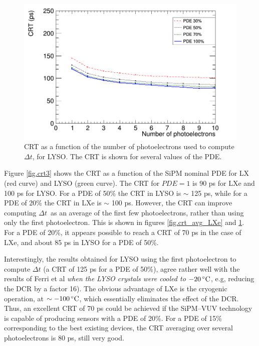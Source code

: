 \documentclass[11pt,a4paper]{article}
\begin{document}
 \begin{figure}[!bhtp]
	\centering
	\includegraphics[scale=0.40]{img/lyso_noCher_avg_npe_phys.png}
	\caption{\label{fig.crt_avg_LYSO} CRT as a function of the number of photoelectrons used to compute $\Delta t$, for LYSO. The CRT is shown for several values of the PDE.}
\end{figure}

Figure \ref{fig.crt3} shows the CRT as a function of the
 SiPM nominal PDE for LX (red curve) and LYSO (green curve). The CRT 
for $PDE=1$ is 90 ps for LXe and 100 ps for LYSO.  For a PDE of 50\% the CRT in LYSO is $\sim$ 125 ps, while for a PDE of 20\%  the CRT in LXe is $\sim$ 100 ps. However, the CRT can improve computing $\Delta t$~as an average of the first few photoelectrons, rather than using only the first photoelectron. This is shown in figures
\ref{fig.crt_avg_LXe} and \ref{fig.crt_avg_LYSO}. For a PDE of 20\%, it appears possible to reach a
CRT of 70 ps in the case of LXe, and about 85 ps in LYSO for a PDE of 50\%.

Interestingly, the results obtained for LYSO using the first photoelectron to compute $\Delta t$ (a CRT of 125 ps for a PDE of 50\%), agree rather well with the results of Ferri et al  \cite{LysoFBK} {\em when the LYSO crystals were cooled 
to $-20\,^{\circ}{\rm C}$}, e.g, reducing the DCR by a factor 16). The obvious advantage of LXe is the cryogenic operation, at $\sim -100\,^{\circ}{\rm C}$, which essentially eliminates the effect of the DCR. Thus, an excellent CRT of 70 ps could be achieved if the SiPM--VUV technology is capable of producing sensors with a PDE of 20\%. For a PDE of 15\% corresponding to the best existing devices, the CRT averaging over several photoelectrons is 80 ps, still very good.
\end{document}
